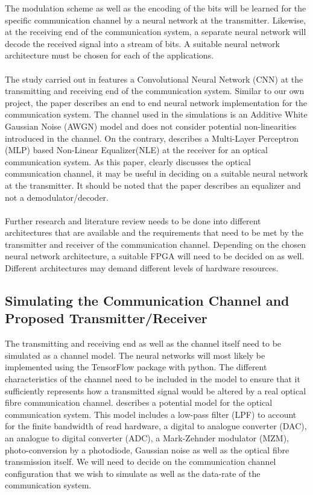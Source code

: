 The modulation scheme as well as the encoding of the bits will be learned for the specific communication channel by a neural network at the transmitter. Likewise, at the receiving end of the communication system, a separate neural network will decode the received signal into a stream of bits. A suitable neural network architecture must be chosen for each of the applications. 
\\
\\
The study carried out in \autocite{8664650} features a Convolutional Neural Network (CNN) at the transmitting and receiving end of the communication system. Similar to our own project, the paper describes an end to end neural network implementation for the communication system. The channel used in the simulations is an Additive White Gaussian Noise (AWGN) model and does not consider potential non-linearities introduced in the channel. On the contrary, \autocite{6975096} describes a Multi-Layer Perceptron (MLP) based Non-Linear Equalizer(NLE) at the receiver for an optical communication system. As this paper, clearly discusses the optical communication channel, it may be useful in deciding on a suitable neural network at the transmitter. It should be noted that the paper describes an equalizer and not a demodulator/decoder. 
\\
\\
Further research and literature review needs to be done into different architectures that are available and the requirements that need to be met by the transmitter and receiver of the communication channel. Depending on the chosen neural network architecture, a suitable FPGA will need to be decided on as well. Different architectures may demand different levels of hardware resources.

\subsection{Simulating the Communication Channel and Proposed Transmitter/Receiver}

The transmitting and receiving end as well as the channel itself need to be simulated as a channel model. The neural networks will most likely be implemented using the TensorFlow package with python. The different characteristics of the channel need to be included in the model to ensure that it sufficiently represents how a transmitted signal would be altered by a real optical fibre communication channel. \autocite{8433895} describes a potential model for the optical communication system. This model includes a low-pass filter (LPF) to account for the finite bandwidth of read hardware, a digital to analogue converter (DAC), an analogue to digital converter (ADC), a Mark-Zehnder modulator (MZM), photo-conversion by a photodiode, Gaussian noise as well as the optical fibre transmission itself. We will need to decide on the communication channel configuration that we wish to simulate as well as the data-rate of the communication system. 

